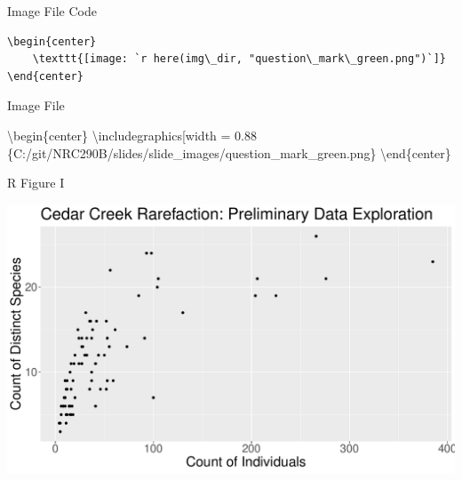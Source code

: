 \documentclass[
  ignorenonframetext,
]{beamer}
\begin{document}
\begin{frame}[fragile]{Image File Code}
\protect\hypertarget{image-file-code}{}

\begin{verbatim}
\begin{center}
    \texttt{[image: `r here(img\_dir, "question\_mark\_green.png")`]}
\end{center}
\end{verbatim}

\end{frame}

\begin{frame}{Image File}
\protect\hypertarget{image-file}{}

\textbackslash begin\{center\} \textbackslash includegraphics{[}width =
0.88\textwidth{]}
\{C:/git/NRC290B/slides/slide\_images/question\_mark\_green.png\}
\textbackslash end\{center\}

\end{frame}

\begin{frame}{R Figure I}
\protect\hypertarget{r-figure-i}{}

\includegraphics{slide_element_templates_files/figure-beamer/r figure fixed aspect-1.pdf}

\end{frame}
\end{document}

